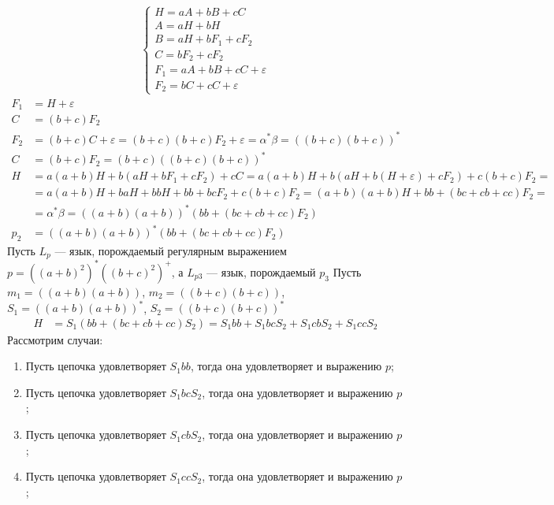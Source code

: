 \begin{align*}
	\left\{
	\begin{array}{l}
		H = aA + bB + cC                 \\
		A = aH + bH                      \\
		B = aH + bF_1 + cF_2             \\
		C = bF_2 + cF_2                  \\
		F_1 = aA + bB + cC + \varepsilon \\
		F_2 = bC + cC + \varepsilon
	\end{array}
	\right.
\end{align*}
\begin{align*}
	F_1 & = H + \varepsilon                                                                                \\
	C   & = (b+c)F_2                                                                                       \\
	F_2 & = (b+c)C + \varepsilon = (b+c)(b+c)F_2 + \varepsilon = \alpha^* \beta = ((b+c)(b+c))^*           \\
	C   & = (b+c)F_2 = (b+c)((b+c)(b+c))^*                                                                 \\
	H   & = a(a+b)H + b(aH + bF_1 + cF_2) + cC = a(a+b)H + b(aH + b(H + \varepsilon) + cF_2) + c(b+c)F_2 = \\
	    & = a(a+b)H + baH + bbH + bb + bcF_2 + c(b+c)F_2 = (a+b)(a+b)H + bb + (bc + cb + cc)F_2 =          \\
	    & = \alpha^* \beta = ((a+b)(a+b))^* (bb + (bc + cb + cc)F_2)  \\
  p_2 & = ((a+b)(a+b))^* (bb + (bc + cb + cc)F_2)
\end{align*}
Пусть \(L_p\) --- язык, порождаемый регулярным выражением \(p = ((a+b)^2)^*((b+c)^2)^+\), а \(L_{p3}\) --- язык, порождаемый \(p_3\)
Пусть \(m_1 = ((a+b)(a+b))\), \(m_2 = ((b+c)(b+c))\), \(S_1 = ((a+b)(a+b))^*\), \(S_2 = ((b+c)(b+c))^*\)
\begin{align*}
	H & = S_1 (bb + (bc + cb + cc)S_2) = S_1bb + S_1bcS_2 + S_1cbS_2 + S_1ccS_2
\end{align*}
Рассмотрим случаи:
\begin{enumerate}
  \item Пусть цепочка удовлетворяет \(S_1bb\), тогда она удовлетворяет и выражению \(p\);
  \item Пусть цепочка удовлетворяет \(S_1bcS_2\), тогда она удовлетворяет и выражению \(p\);
  \item Пусть цепочка удовлетворяет \(S_1cbS_2\), тогда она удовлетворяет и выражению \(p\);
  \item Пусть цепочка удовлетворяет \(S_1ccS_2\), тогда она удовлетворяет и выражению \(p\);
\end{enumerate}

